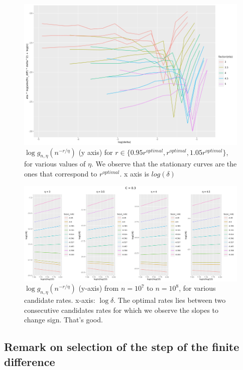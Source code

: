 \documentclass[a4paper]{article}
\begin{document}
\begin{figure}[!htbp]
	\caption{$\log g_{n, \eta}(n^{-r / \eta})$ (y axis) for $r \in \{0.95 r^{optimal}, r^{optimal}, 1.05 r^{optimal} \}$, for various values of $\eta$. We observe that the stationary curves are the ones that correspond to $r^{optimal}$. x axis is $log(\delta)$}
   \includegraphics[scale = 0.4]{LHS-bracketing_of_delta_n^star-easy-tp.png}
\end{figure}

\begin{figure}[!htbp]
	\caption{$\log g_{n, \eta}(n^{-r / \eta})$ (y-axis) from $n = 10^7$ to $n=10^8$, for various candidate rates. x-axis: $\log \delta$. The optimal rates lies between two consecutive candidates rates for which we observe the slopes to change sign. That's good.}
   \includegraphics[scale = 0.4]{rates_comb-easy-tp-1e7to1e8.png}
\end{figure}

\bigskip

\subsection{Remark on selection of the step of the finite difference} 
\end{document}
